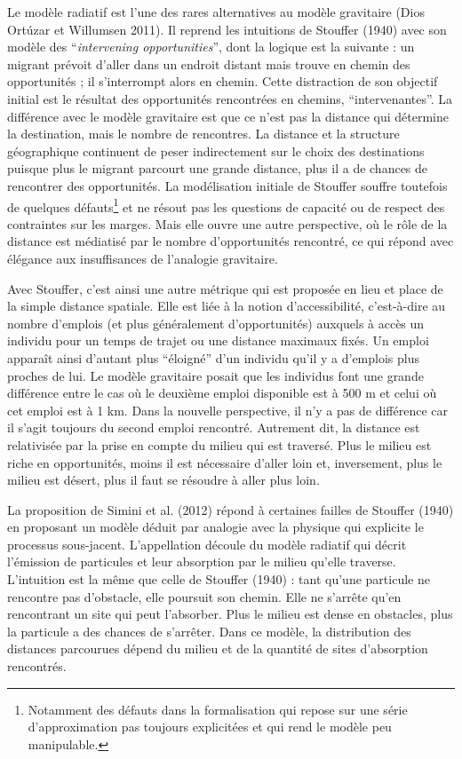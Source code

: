 \documentclass[
  10pt,
  a4paper,
  numbers=noendperiod,
  DIV=9]{scrreprt}
\begin{document}
Le modèle radiatif est l'une des rares alternatives au modèle gravitaire
(Dios Ortúzar et Willumsen 2011). Il reprend les intuitions de Stouffer
(1940) avec son modèle des ``\emph{intervening opportunities}'', dont la
logique est la suivante : un migrant prévoit d'aller dans un endroit
distant mais trouve en chemin des opportunités ; il s'interrompt alors
en chemin. Cette distraction de son objectif initial est le résultat des
opportunités rencontrées en chemins, ``intervenantes''. La différence
avec le modèle gravitaire est que ce n'est pas la distance qui détermine
la destination, mais le nombre de rencontres. La distance et la
structure géographique continuent de peser indirectement sur le choix
des destinations puisque plus le migrant parcourt une grande distance,
plus il a de chances de rencontrer des opportunités. La modélisation
initiale de Stouffer souffre toutefois de quelques défauts\footnote{Notamment
  des défauts dans la formalisation qui repose sur une série
  d'approximation pas toujours explicitées et qui rend le modèle peu
  manipulable.} et ne résout pas les questions de capacité ou de respect
des contraintes sur les marges. Mais elle ouvre une autre perspective,
où le rôle de la distance est médiatisé par le nombre d'opportunités
rencontré, ce qui répond avec élégance aux insuffisances de l'analogie
gravitaire.

Avec Stouffer, c'est ainsi une autre métrique qui est proposée en lieu
et place de la simple distance spatiale. Elle est liée à la notion
d'accessibilité, c'est-à-dire au nombre d'emplois (et plus généralement
d'opportunités) auxquels à accès un individu pour un temps de trajet ou
une distance maximaux fixés. Un emploi apparaît ainsi d'autant plus
``éloigné'' d'un individu qu'il y a d'emplois plus proches de lui. Le
modèle gravitaire posait que les individus font une grande différence
entre le cas où le deuxième emploi disponible est à 500 m et celui où
cet emploi est à 1 km. Dans la nouvelle perspective, il n'y a pas de
différence car il s'agit toujours du second emploi rencontré. Autrement
dit, la distance est relativisée par la prise en compte du milieu qui
est traversé. Plus le milieu est riche en opportunités, moins il est
nécessaire d'aller loin et, inversement, plus le milieu est désert, plus
il faut se résoudre à aller plus loin.

La proposition de Simini et al. (2012) répond à certaines failles de
Stouffer (1940) en proposant un modèle déduit par analogie avec la
physique qui explicite le processus sous-jacent. L'appellation découle
du modèle radiatif qui décrit l'émission de particules et leur
absorption par le milieu qu'elle traverse. L'intuition est la même que
celle de Stouffer (1940) : tant qu'une particule ne rencontre pas
d'obstacle, elle poursuit son chemin. Elle ne s'arrête qu'en rencontrant
un site qui peut l'absorber. Plus le milieu est dense en obstacles, plus
la particule a des chances de s'arrêter. Dans ce modèle, la distribution
des distances parcourues dépend du milieu et de la quantité de sites
d'absorption rencontrés.
\end{document}

